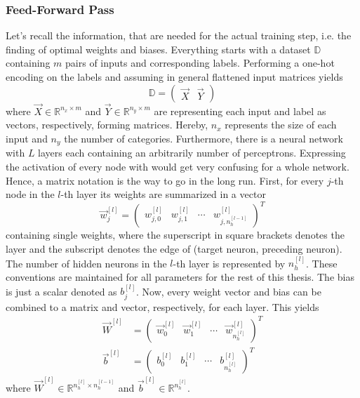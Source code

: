 \subsubsection{Feed-Forward Pass}
\label{sec:training-forward-pass}
Let's recall the information, that are needed for the actual training step, i.e. the finding of optimal weights and biases.
Everything starts with a dataset $\mathbb{D}$ containing $m$ pairs of inputs and corresponding labels.
Performing a one-hot encoding on the labels and assuming in general flattened input matrices yields
\begin{equation}
	\label{eq:dataset-one-hot}
	\mathbb{D} =
	\begin{pmatrix}
		\vec{X} & \vec{Y}
	\end{pmatrix}
\end{equation}
where $\vec{X} \in \mathbb{R}^{n_x \times m}$ and $\vec{Y} \in \mathbb{R}^{n_y \times m}$ are representing each input and label as vectors, respectively, forming matrices.
Hereby, $n_x$ represents the size of each input and $n_y$ the number of categories.
Furthermore, there is a neural network with $L$ layers each containing an arbitrarily number of perceptrons.
Expressing the activation of every node with  would get very confusing for a whole network.
Hence, a matrix notation is the way to go in the long run.
First, for every $j$-th node in the $l$-th layer its weights are summarized in a vector
\begin{equation}
	\label{eq:weights-vector}
	\vec{w}^{[l]}_j =
	\begin{pmatrix}
		w^{[l]}_{j,0} & w^{[l]}_{j,1} & \cdots & w^{[l]}_{j,n^{[l-1]}_h}
	\end{pmatrix}^T
\end{equation}
containing single weights, where the superscript in square brackets denotes the layer and the subscript denotes the edge of (target neuron, preceding neuron).
The number of hidden neurons in the $l$-th layer is represented by $n^{[l]}_h$.
These conventions are maintained for all parameters for the rest of this thesis.
The bias is just a scalar denoted as $b^{[l]}_j$. 
Now, every weight vector and bias can be combined to a matrix and vector, respectively, for each layer.
This yields
\begin{subequations}
\label{eq:parameters}
	\begin{align}
		\vec{W}^{[l]} &=
		\begin{pmatrix}
			\vec{w}^{[l]}_0 & \vec{w}^{[l]}_1 & \cdots & \vec{w}^{[l]}_{n^{[l]}_h}
		\end{pmatrix}^T
		\label{eq:weights}
		\\
		\vec{b}^{[l]} &=
			\begin{pmatrix}
				b^{[l]}_0 & b^{[l]}_1 & \cdots & b^{[l]}_{n^{[l]}_h}
			\end{pmatrix}^T
		\label{eq:biases}
	\end{align}
\end{subequations}
where $\vec{W}^{[l]} \in \mathbb{R}^{n^{[l]}_h \times n^{[l-1]}_h}$ and $\vec{b}^{[l]} \in \mathbb{R}^{n^{[l]}_h}$.

